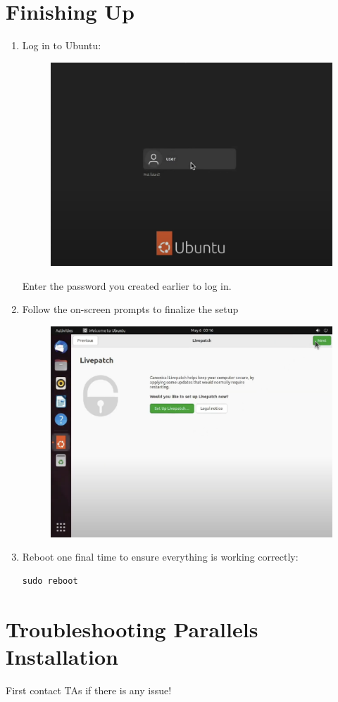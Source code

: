 \documentclass[11pt,a4paper]{article}
\begin{document}
\section{Finishing Up}
\begin{enumerate}
    \item Log in to Ubuntu:
    \begin{figure}[htp]
            \centering
            \includegraphics[width=0.6\linewidth]{images/step23.png}
        \end{figure}
    Enter the password you created earlier to log in.
    \item Follow the on-screen prompts to finalize the setup
    \begin{figure}[htp]
            \centering
            \includegraphics[width=0.6\linewidth]{images/step24.png}
        \end{figure}
    \item Reboot one final time to ensure everything is working correctly:
\begin{lstlisting}
sudo reboot
\end{lstlisting}
\end{enumerate}

\section{Troubleshooting Parallels Installation}
First contact TAs if there is any issue!
\end{document}
